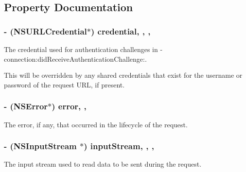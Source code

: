 \subsection{Property Documentation}
\hypertarget{interface_a_f_u_r_l_connection_operation_a3117677d8c96460f0bd1b4d3b13b6da8}{
\subsubsection[{credential}]{\setlength{\rightskip}{0pt plus 5cm}-\/ (N\-S\-U\-R\-L\-Credential$\ast$) credential\hspace{0.3cm}{\ttfamily [read]}, {\ttfamily [write]}, {\ttfamily [nonatomic]}, {\ttfamily [strong]}}}\label{interface_a_f_u_r_l_connection_operation_a3117677d8c96460f0bd1b4d3b13b6da8}
The credential used for authentication challenges in {\ttfamily -\/connection\-:did\-Receive\-Authentication\-Challenge\-:}.

This will be overridden by any shared credentials that exist for the username or password of the request U\-R\-L, if present. \hypertarget{interface_a_f_u_r_l_connection_operation_a68b600bc05847243902758f5565353ed}{
\subsubsection[{error}]{\setlength{\rightskip}{0pt plus 5cm}-\/ (N\-S\-Error$\ast$) error\hspace{0.3cm}{\ttfamily [read]}, {\ttfamily [nonatomic]}, {\ttfamily [strong]}}}\label{interface_a_f_u_r_l_connection_operation_a68b600bc05847243902758f5565353ed}
The error, if any, that occurred in the lifecycle of the request. \hypertarget{interface_a_f_u_r_l_connection_operation_a2a8f5ad38fa0f464f0104f9e46cf4043}{
\subsubsection[{input\-Stream}]{\setlength{\rightskip}{0pt plus 5cm}-\/ (N\-S\-Input\-Stream $\ast$) input\-Stream\hspace{0.3cm}{\ttfamily [read]}, {\ttfamily [write]}, {\ttfamily [nonatomic]}, {\ttfamily [strong]}}}\label{interface_a_f_u_r_l_connection_operation_a2a8f5ad38fa0f464f0104f9e46cf4043}
The input stream used to read data to be sent during the request.


